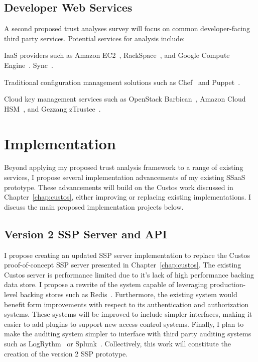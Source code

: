 \subsection{Developer Web Services}

A second proposed trust analyses survey will focus on common
developer-facing third party services. Potential services for analysis
include:

\begin{packed_item}
\item IaaS providers such as Amazon EC2~\cite{amazon-ec2},
  RackSpace~\cite{rackspace-compute}, and Google Compute
  Engine~\cite{google-compute}.  Sync~\cite{bittorrent-sync}.
\item Traditional configuration management solutions such as
  Chef~\cite{chef} and Puppet~\cite{puppet}.
\item Cloud key management services such as OpenStack
  Barbican~\cite{openstack-barbican}, Amazon Cloud
  HSM~\cite{amazon-hsm}, and Gezzang zTrustee~\cite{gazzang}.
\end{packed_item}

\section{Implementation}

Beyond applying my proposed trust analysis framework to a range of
existing services, I propose several implementation advancements of my
existing SSaaS prototype. These advancements will build on the Custos
work discussed in Chapter~\ref{chap:custos}, either improving or
replacing existing implementations. I discuss the main proposed
implementation projects below.

\subsection{Version 2 SSP Server and API}

I propose creating an updated SSP server implementation to replace the
Custos proof-of-concept SSP server presented in
Chapter~\ref{chap:custos}. The existing Custos server is performance
limited due to it's lack of high performance backing data store. I
propose a rewrite of the system capable of leveraging production-level
backing stores such as Redis~\cite{redis}. Furthermore, the existing
system would benefit form improvements with respect to its
authentication and authorization systems. These systems will be
improved to include simpler interfaces, making it easier to add
plugins to support new access control systems. Finally, I plan to make
the auditing system simpler to interface with third party auditing
systems such as LogRythm~\cite{logrythm} or
Splunk~\cite{splunk}. Collectively, this work will constitute the
creation of the version 2 SSP prototype.

